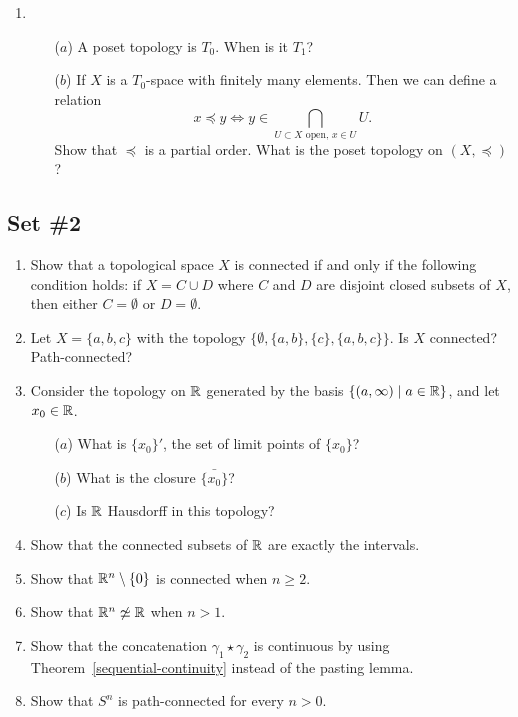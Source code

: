 \begin{enumerate}[label=1.\arabic*]
  \item \begin{itemize}
		\item[($a$)] A poset topology is $T_0$. When is it $T_1$?
		\item[($b$)] If $X$ is a $T_0$-space with finitely many elements. Then we can define a relation
		\[x\preceq y \Leftrightarrow y\in \bigcap_{U\subset X\text{ open}, \,x\in U} U.\]
		Show that $\preceq$ is a partial order. What is the poset topology on $(X,\preceq)$?
	\end{itemize}
\end{enumerate}

\subsection{Set \#2}
\begin{enumerate}[label=2.\arabic*]
  \item Show that a topological space $X$ is connected if and only if the following condition holds: if $X = C \cup D$ where $C$ and $D$ are disjoint closed subsets of $X$, then either $C = \emptyset$ or $D = \emptyset$.
  \item Let $X = \{a,b,c\}$ with the topology $\{\emptyset,\{a,b\},\{c\},\{a,b,c\}\}$. Is $X$ connected? Path-connected?
  \item Consider the topology on $\mathbb{R}$ generated by the basis $\{(a,\infty) \mid a \in \mathbb{R} \}$, and let $x_0 \in \mathbb{R}$. \begin{itemize}
    \item[($a$)] What is $\{x_0\}'$, the set of limit points of $\{x_0\}$?
    \item[($b$)] What is the closure $\bar{\{x_0\}}$?
    \item[($c$)] Is $\mathbb{R}$ Hausdorff in this topology?
  \end{itemize}
  \item \label{connected-implies-interval} Show that the connected subsets of $\mathbb{R}$ are exactly the intervals.
  \item \label{origin-removed-connected} Show that $\mathbb{R}^n \setminus \{0\}$ is connected when $n \geq 2$.
  \item Show that $\mathbb{R}^n \not\simeq \mathbb{R}$ when $n > 1$.
  \item Show that the concatenation $\gamma_1 \star \gamma_2$ is continuous by using Theorem~\ref{sequential-continuity} instead of the pasting lemma.
  \item Show that $S^n$ is path-connected for every $n > 0$.

\end{enumerate}
